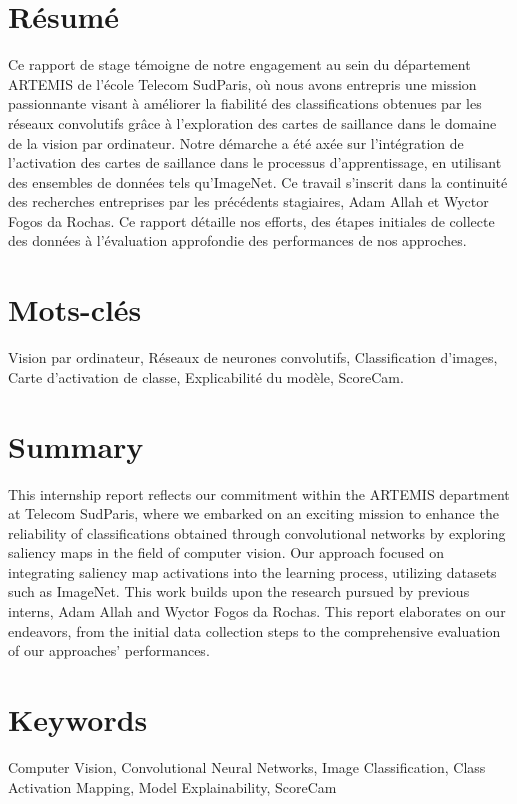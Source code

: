 \documentclass{report}
\begin{document}
{\section*{Résumé}
\hspace{1.6cm}Ce rapport de stage témoigne de notre engagement au sein du département ARTEMIS de l'école Telecom SudParis, où nous avons entrepris une mission passionnante visant à améliorer la fiabilité des classifications obtenues par les réseaux convolutifs grâce à l'exploration des cartes de saillance dans le domaine de la vision par ordinateur. Notre démarche a été axée sur l'intégration de l'activation des cartes de saillance dans le processus d'apprentissage, en utilisant des ensembles de données tels qu'ImageNet. Ce travail s'inscrit dans la continuité des recherches entreprises par les précédents stagiaires, Adam Allah et Wyctor Fogos da Rochas. Ce rapport détaille nos efforts, des étapes initiales de collecte des données à l'évaluation approfondie des performances de nos approches.

\section*{Mots-clés}
Vision par ordinateur, Réseaux de neurones convolutifs, Classification d'images, Carte d'activation de classe, Explicabilité du modèle, ScoreCam.


\section*{Summary}
\hspace{1.6cm}This internship report reflects our commitment within the ARTEMIS department at Telecom SudParis, where we embarked on an exciting mission to enhance the reliability of classifications obtained through convolutional networks by exploring saliency maps in the field of computer vision. Our approach focused on integrating saliency map activations into the learning process, utilizing datasets such as ImageNet. This work builds upon the research pursued by previous interns, Adam Allah and Wyctor Fogos da Rochas. This report elaborates on our endeavors, from the initial data collection steps to the comprehensive evaluation of our approaches' performances.

\section*{Keywords}
Computer Vision, Convolutional Neural Networks, Image Classification, Class Activation Mapping, Model Explainability, ScoreCam}
\end{document}
